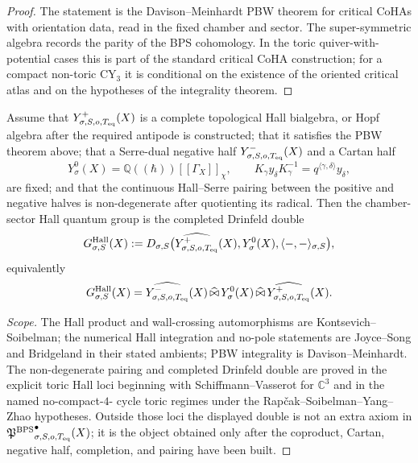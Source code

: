 \begin{proof}
The statement is the Davison--Meinhardt PBW theorem for critical CoHAs
with orientation data, read in the fixed chamber and sector. The
super-symmetric algebra records the parity of the BPS cohomology. In
the toric quiver-with-potential cases this is part of the standard
critical CoHA construction; for a compact non-toric CY$_3$ it is conditional
on the existence of the oriented critical atlas and on the hypotheses of
the integrality theorem.
\end{proof}

\begin{theorem}
\label{thm:quantum-group-as-positive-geometry-double}
Assume that $Y^+_{\sigma,S,o,T_{\mathrm{eq}}}(X)$ is a complete topological Hall
bialgebra, or Hopf algebra after the required antipode is constructed;
that it satisfies the PBW theorem above; that a Serre-dual negative half
$Y^-_{\sigma,S,o,T_{\mathrm{eq}}}(X)$ and a Cartan half
\[
 Y^0_\sigma(X)=\mathbb Q((\hbar))[[\Gamma_X]]_\chi,
 \qquad
 K_\gamma y_\delta K_\gamma^{-1}
 =
 q^{\langle\gamma,\delta\rangle}y_\delta ,
\]
are fixed; and that the continuous Hall--Serre pairing between the
positive and negative halves is non-degenerate after quotienting its
radical. Then the chamber-sector Hall quantum group is the completed
Drinfeld double
\[
 G^{\mathrm{Hall}}_{\sigma,S}(X)
 :=
 D_{\sigma,S}
 \bigl(
 \widehat{Y^+_{\sigma,S,o,T_{\mathrm{eq}}}}(X),
 Y^0_\sigma(X),
 \langle-,-\rangle_{\sigma,S}
 \bigr),
\]
equivalently
\[
 G^{\mathrm{Hall}}_{\sigma,S}(X)
 =
 \widehat{Y^-_{\sigma,S,o,T_{\mathrm{eq}}}}(X)
 \,\widehat{\bowtie}\,
 Y^0_\sigma(X)
 \,\widehat{\bowtie}\,
 \widehat{Y^+_{\sigma,S,o,T_{\mathrm{eq}}}}(X).
\]
\end{theorem}

\begin{proof}[Scope]
The Hall product and wall-crossing automorphisms are Kontsevich--
Soibelman; the numerical Hall integration and no-pole statements are
Joyce--Song and Bridgeland in their stated ambients; PBW integrality is
Davison--Meinhardt. The non-degenerate pairing and completed Drinfeld
double are proved in the explicit toric Hall loci beginning with
Schiffmann--Vasserot for $\mathbb{C}^3$ and in the named no-compact-$4$-
cycle toric regimes under the Rap\v{c}ak--Soibelman--Yang--Zhao
hypotheses. Outside those loci the displayed double is not an extra
axiom in ${\mathfrak{P}^{\mathrm{BPS}}}^{\bullet}_{\sigma,S,o,T_{\mathrm{eq}}}(X)$; it is the object
obtained only after the coproduct, Cartan, negative half, completion, and
pairing have been built.
\end{proof}

